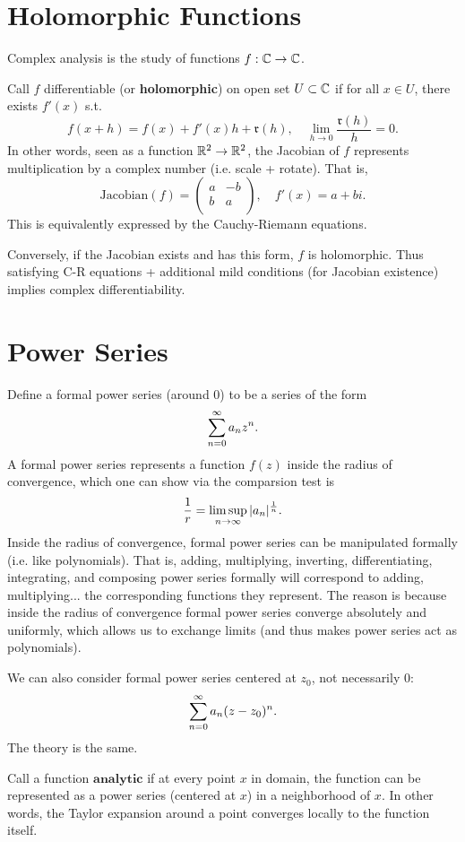\section{Holomorphic Functions}
Complex analysis is the study of functions $f: {\mathbb C} \to {\mathbb C}$.

Call $f$ differentiable (or \textbf{holomorphic}) on open set $U \subset {\mathbb C}$ if for all $x \in U$, there exists $f'(x)$ s.t.
\[
    f(x + h) = f(x) + f'(x)h + \mathfrak r(h), \quad \lim_{h \to 0} \frac{\mathfrak r(h)}{h} = 0.
\]
In other words, seen as a function ${\mathbb R}^2 \to {\mathbb R}^2$, the Jacobian of $f$ represents multiplication by a complex number (i.e. scale + rotate). That is,
\[
    \text{Jacobian}(f) =
    \begin{pmatrix}
        a & -b \\
        b  & a \\
    \end{pmatrix},
    \quad f'(x) = a + bi.
\]
This is equivalently expressed by the Cauchy-Riemann equations.

Conversely, if the Jacobian exists and has this form, $f$ is holomorphic. Thus satisfying C-R equations + additional mild conditions (for Jacobian existence) implies complex differentiability.

\section{Power Series}
Define a formal power series (around 0) to be a series of the form
\[
    \sum_{n = 0}^\infty a_nz^n.
\]
A formal power series represents a function $f(z)$ inside the radius of convergence, which one can show via the comparsion test is
\[
    \frac{1}{r} = \limsup_{n \to \infty} |a_n|^{\frac{1}{n}}.
\]
Inside the radius of convergence, formal power series can be manipulated formally (i.e. like polynomials). That is, adding, multiplying, inverting, differentiating, integrating, and composing power series formally will correspond to adding, multiplying... the corresponding functions they represent. The reason is because inside the radius of convergence formal power series converge absolutely and uniformly, which allows us to exchange limits (and thus makes power series act as polynomials).

We can also consider formal power series centered at $z_0$, not necessarily 0:
\[
    \sum_{n = 0}^\infty a_n(z-z_0)^n.
\]
The theory is the same.

Call a function $\textbf{analytic}$ if at every point $x$ in domain, the function can be represented as a power series (centered at $x$) in a neighborhood of $x$. In other words, the Taylor expansion around a point converges locally to the function itself.

